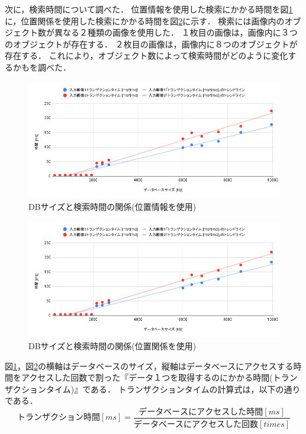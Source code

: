 \documentclass[a4j,12pt,dvipdfmx]{jreport}
\begin{document}
次に，検索時間について調べた．
位置情報を使用した検索にかかる時間を図\ref{fig:img_2_5_2}に，位置関係を使用した検索にかかる時間を図\ref{fig:img_2_5_3}に示す．
検索には画像内のオブジェクト数が異なる２種類の画像を使用した．
１枚目の画像は，画像内に３つのオブジェクトが存在する．
２枚目の画像は，画像内に８つのオブジェクトが存在する．
これにより，オブジェクト数によって検索時間がどのように変化するかもを調べた．
\begin{figure}[H]
  \centering
  \includegraphics[width=13cm]{image/result_2_5_2.png}
  \caption{DBサイズと検索時間の関係(位置情報を使用)}
  \label{fig:img_2_5_2}
\end{figure}

\begin{figure}[H]
  \centering
  \includegraphics[width=13cm]{image/result_2_5_3.png}
  \caption{DBサイズと検索時間の関係(位置関係を使用)}
  \label{fig:img_2_5_3}
\end{figure}

図\ref{fig:img_2_5_2}，図\ref{fig:img_2_5_3}の横軸はデータベースのサイズ，縦軸はデータベースにアクセスする時間をアクセスした回数で割った『データ１つを取得するのにかかる時間(トランザクションタイム)』である．
トランザクションタイムの計算式は，以下の通りである．
\begin{equation}
  トランザクション時間[ms] = \frac{データベースにアクセスした時間[ms]}{データベースにアクセスした回数[times]}
\end{equation}
\end{document}
